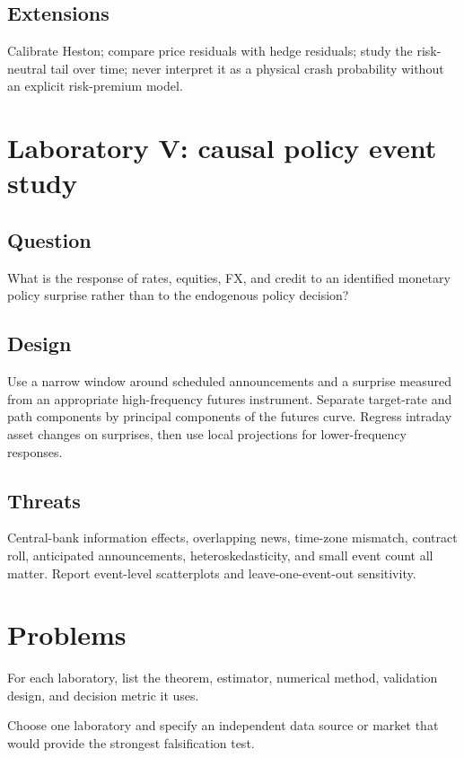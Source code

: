 \subsection*{Extensions}
Calibrate Heston; compare price residuals with hedge residuals; study the risk-neutral
tail over time; never interpret it as a physical crash probability without an
explicit risk-premium model.

\section{Laboratory V: causal policy event study}

\subsection*{Question}
What is the response of rates, equities, FX, and credit to an identified monetary
policy surprise rather than to the endogenous policy decision?

\subsection*{Design}
Use a narrow window around scheduled announcements and a surprise measured from an
appropriate high-frequency futures instrument. Separate target-rate and path
components by principal components of the futures curve. Regress intraday asset
changes on surprises, then use local projections for lower-frequency responses.

\subsection*{Threats}
Central-bank information effects, overlapping news, time-zone mismatch, contract
roll, anticipated announcements, heteroskedasticity, and small event count all
matter. Report event-level scatterplots and leave-one-event-out sensitivity.

\section{Problems}

\begin{exercise}
For each laboratory, list the theorem, estimator, numerical method, validation
design, and decision metric it uses.
\end{exercise}
\begin{exercise}
Choose one laboratory and specify an independent data source or market that would
provide the strongest falsification test.
\end{exercise}


